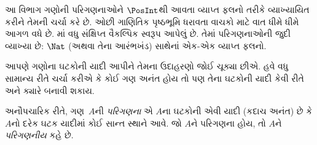 \begingroup
\makeatletter{}\makeatother


\label{guunit:OLP-0029}


\begin{editorial}
આ વિભાગ ગણોની પરિગણનાઓને $\PosInt$થી આવતા વ્યાપ્ત
ફલનો તરીકે વ્યાખ્યાયિત કરીને તેમની ચર્ચા કરે છે.
ઓછી ગાણિતિક પૃષ્ઠભૂમિ ધરાવતા વાચકો માટે વાત ધીમે ધીમે
આગળ વધે છે. માં વધુ સંક્ષિપ્ત
વૈકલ્પિક સ્વરૂપ આપેલું છે. તેમાં પરિગણનાઓની જુદી વ્યાખ્યા
છે: $\Nat$ (અથવા તેના આરંભખંડ) સાથેનાં એક-એક
વ્યાપ્ત ફલનો.
\end{editorial}

\begin{explain}
આપણે ગણોના ઘટકોની યાદી આપીને તેમના ઉદાહરણો
જોઈ ચૂક્યા છીએ. હવે વધુ સામાન્ય રીતે ચર્ચા કરીએ કે
કોઈ ગણ અનંત હોય તો પણ તેના ઘટકોની યાદી
કેવી રીતે અને ક્યારે બનાવી શકાય.
\end{explain}

\begin{defn}[પરિગણના, અનૌપચારિક રીતે]
અનૌપચારિક રીતે, ગણ~$A$ની \emph{પરિગણના} એ
$A$ના ઘટકોની એવી યાદી (કદાચ અનંત) છે
કે $A$નો દરેક ઘટક યાદીમાં કોઈ સાન્ત સ્થાને
આવે. જો $A$ને પરિગણના હોય, તો $A$ને
\emph{પરિગણનીય} કહે છે.
\end{defn}

